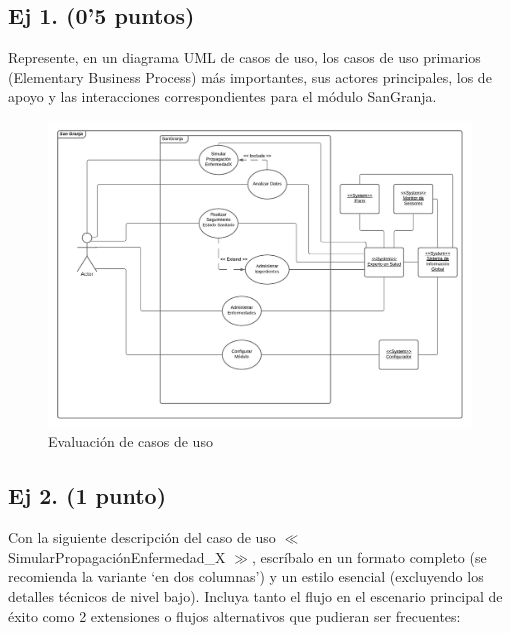 \documentclass[a4paper]{article}
\begin{document}
\subsection{Ej 1. (0’5 puntos)}
Represente, en un diagrama UML de casos de uso, los casos de uso primarios (Elementary Business Process) más importantes, sus actores principales, los de apoyo y las interacciones correspondientes para el módulo SanGranja.
\begin{figure}[H]
	\centering
	\includegraphics[width=1\linewidth]{graphics/1-MCU.pdf}
	\caption{Evaluación de casos de uso}
\end{figure}


\subsection{Ej 2. (1 punto)}Con la siguiente descripción del  caso de uso  $\ll$SimularPropagaciónEnfermedad\_X $\gg$, escríbalo en un formato completo (se recomienda la variante ‘en dos columnas’) y un estilo esencial (excluyendo los detalles técnicos de nivel bajo). Incluya tanto el flujo en el escenario principal de éxito como 2 extensiones o flujos alternativos que pudieran ser frecuentes:\\
	
\end{document}
